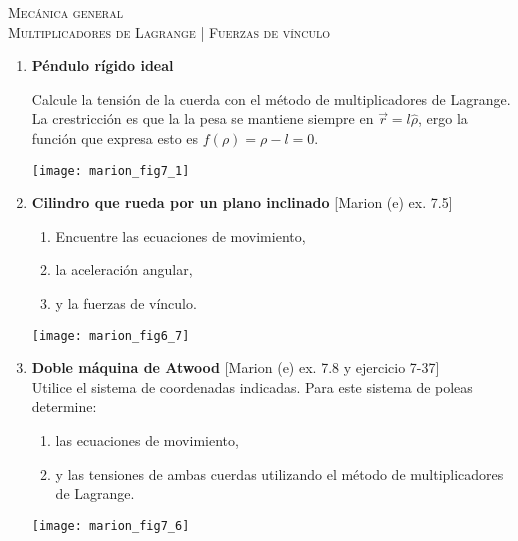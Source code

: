 \documentclass[11pt,spanish,a4paper]{article}
\begin{document}
\begin{center}
  \textsc{\large Mecánica general}\\
  \textsc{\large Multiplicadores de Lagrange | Fuerzas de vínculo}
\end{center}

\begin{enumerate}


	
\item \textbf{Péndulo rígido ideal}\\
\begin{minipage}[t][1.5cm]{0.85\textwidth}
Calcule la tensión de la cuerda con el método de multiplicadores de Lagrange.
La crestricción es que la la pesa se mantiene siempre en \(\vec{r} = l \hat{\rho}\), ergo la función que expresa esto es \(f(\rho) = \rho - l = 0\).
\end{minipage}
\begin{minipage}[c][3cm][t]{0.1\textwidth}
	\texttt{[image: marion\_fig7\_1]}
\end{minipage}



\item \textbf{Cilindro que rueda por un plano inclinado} [Marion (e) ex. 7.5]\\
\begin{minipage}[t][3.5cm]{0.7\textwidth}
	\begin{enumerate}
		\item Encuentre las ecuaciones de movimiento, 
		\item la aceleración angular,
		\item y la fuerzas de vínculo. 
	\end{enumerate}
\end{minipage}
\begin{minipage}[c][2cm][t]{0.25\textwidth}
	\texttt{[image: marion\_fig6\_7]}
\end{minipage}


	
\item
\begin{minipage}[t][5.5cm]{0.6\textwidth}
\textbf{Doble máquina de Atwood} [Marion (e) ex. 7.8 y ejercicio 7-37]\\
Utilice el sistema de coordenadas indicadas.
Para este sistema de poleas determine: 
\begin{enumerate}
	\item las ecuaciones de movimiento,
	\item y las tensiones de ambas cuerdas utilizando el método de multiplicadores de Lagrange.
\end{enumerate}
\end{minipage}
\begin{minipage}[c][4cm][t]{0.35\textwidth}
	\texttt{[image: marion\_fig7\_6]}
\end{minipage}




\end{enumerate}
\end{document}
